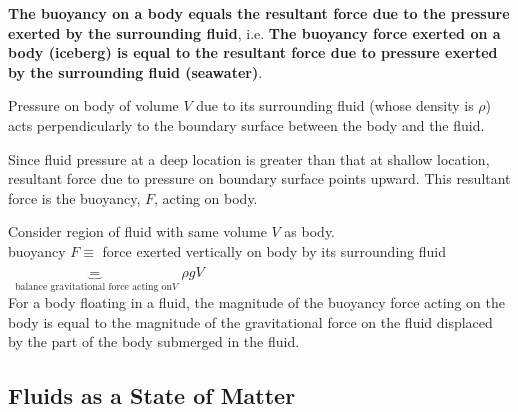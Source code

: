 \documentclass[10pt]{amsart}
\begin{document}
\begin{multicols*}{2}
\textbf{The buoyancy on a body equals the resultant force due to the pressure exerted by the surrounding fluid}, i.e.
\textbf{The buoyancy force exerted on a body (iceberg) is equal to the resultant force due to pressure exerted by the surrounding fluid (seawater)}.


Pressure on body of volume $V$ due to its surrounding fluid (whose density is $\rho$) acts perpendicularly to the boundary surface between the body and the fluid. 

Since fluid pressure at a deep location is greater than that at shallow location, resultant force due to pressure on boundary surface points upward. This resultant force is the buoyancy, $F$, acting on body. 

Consider region of fluid with same volume $V$ as body. \\

buoyancy $F \equiv$ force exerted vertically on body by its surrounding fluid $ \underbrace{ =}_{ \text{ balance gravitational force acting on} V }  \rho g V$ \\

For a body floating in a fluid, the magnitude of the buoyancy force acting on the body is equal to the magnitude of the gravitational force on the fluid displaced by the part of the body submerged in the fluid.



\subsection{Fluids as a State of Matter}


\end{multicols*}
\end{document}
